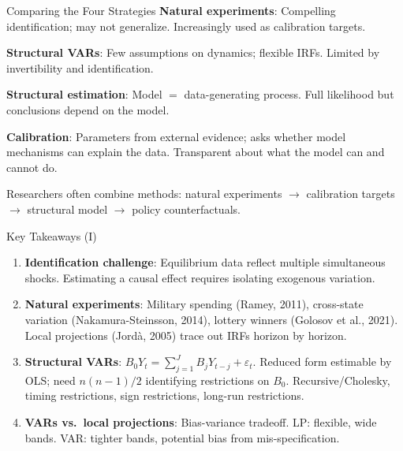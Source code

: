 \documentclass[blue]{beamer}
\begin{document}
\begin{frame}{Comparing the Four Strategies}
	\textbf{Natural experiments}: Compelling identification; may not generalize. Increasingly used as calibration targets.
	
	\bigskip
	\textbf{Structural VARs}: Few assumptions on dynamics; flexible IRFs. Limited by invertibility and identification.
	
	\bigskip
	\textbf{Structural estimation}: Model $=$ data-generating process. Full likelihood but conclusions depend on the model.
	
	\bigskip
	\textbf{Calibration}: Parameters from external evidence; asks whether model mechanisms can explain the data. Transparent about what the model can and cannot do.
	
	\bigskip
	Researchers often combine methods: natural experiments $\to$ calibration targets $\to$ structural model $\to$ policy counterfactuals.
\end{frame}

\begin{frame}{Key Takeaways (I)}
	\begin{enumerate}
		\item \textbf{Identification challenge}: Equilibrium data reflect multiple simultaneous shocks. Estimating a causal effect requires isolating exogenous variation.
		
		\item \textbf{Natural experiments}: Military spending (Ramey, 2011), cross-state variation (Nakamura-Steinsson, 2014), lottery winners (Golosov et al., 2021). Local projections (Jord\`{a}, 2005) trace out IRFs horizon by horizon.
		
		\item \textbf{Structural VARs}: $B_0 Y_t = \sum_{j=1}^{J} B_j Y_{t-j} + \varepsilon_t$. Reduced form estimable by OLS; need $n(n-1)/2$ identifying restrictions on $B_0$. Recursive/Cholesky, timing restrictions, sign restrictions, long-run restrictions.
		
		\item \textbf{VARs vs.\ local projections}: Bias-variance tradeoff. LP: flexible, wide bands. VAR: tighter bands, potential bias from mis-specification.
	\end{enumerate}
\end{frame}
\end{document}
